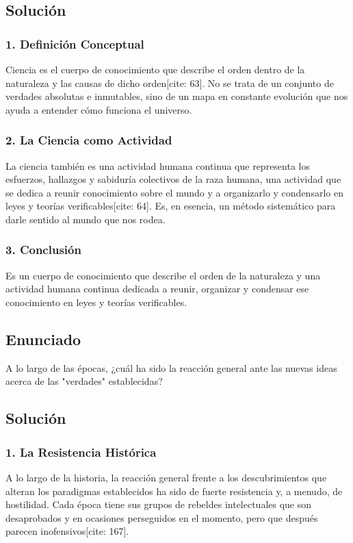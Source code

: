 \documentclass[12pt, a4paper]{article}
\begin{document}
\subsection*{Solución}

\subsubsection*{1. Definición Conceptual}
Ciencia es el cuerpo de conocimiento que describe el orden dentro de la naturaleza y las causas de dicho orden[cite: 63]. No se trata de un conjunto de verdades absolutas e inmutables, sino de un mapa en constante evolución que nos ayuda a entender cómo funciona el universo.

\subsubsection*{2. La Ciencia como Actividad}
La ciencia también es una actividad humana continua que representa los esfuerzos, hallazgos y sabiduría colectivos de la raza humana, una actividad que se dedica a reunir conocimiento sobre el mundo y a organizarlo y condensarlo en leyes y teorías verificables[cite: 64]. Es, en esencia, un método sistemático para darle sentido al mundo que nos rodea.

\subsubsection*{3. Conclusión}
Es un cuerpo de conocimiento que describe el orden de la naturaleza y una actividad humana continua dedicada a reunir, organizar y condensar ese conocimiento en leyes y teorías verificables.

\newpage

\subsection*{Enunciado}
A lo largo de las épocas, ¿cuál ha sido la reacción general ante las nuevas ideas acerca de las "verdades" establecidas?

\subsection*{Solución}

\subsubsection*{1. La Resistencia Histórica}
A lo largo de la historia, la reacción general frente a los descubrimientos que alteran los paradigmas establecidos ha sido de fuerte resistencia y, a menudo, de hostilidad. Cada época tiene sus grupos de rebeldes intelectuales que son desaprobados y en ocasiones perseguidos en el momento, pero que después parecen inofensivos[cite: 167].
\end{document}
